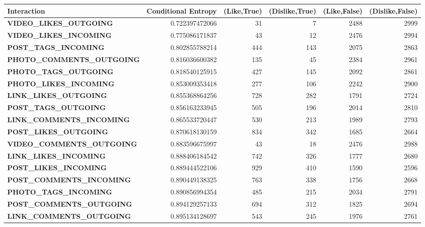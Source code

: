 \begin{table}
\begin{tabular}{| >{\small}l | >{\small}r | >{\small}r | >{\small}r | >{\small}r | >{\small}r |}
	\end{tabular}
\end{table}

\begin{table}
	\centering
	\begin{tabular}{| >{\small}l | >{\small}r | >{\small}r | >{\small}r | >{\small}r | >{\small}r |}
	\hline
	Interaction & Conditional Entropy & (Like,True) & (Dislike,True) & (Like,False) & (Dislike,False)\\
	\hline
	\textbf{VIDEO\_LIKES\_OUTGOING} & 0.722397472066 & 31 & 7 & 2488 & 2999\\
	\hline
	\textbf{VIDEO\_LIKES\_INCOMING} & 0.775086171837 & 43 & 12 & 2476 & 2994\\
	\hline
	\textbf{POST\_TAGS\_INCOMING} & 0.802855788214 & 444 & 143 & 2075 & 2863\\
	\hline
	\textbf{PHOTO\_COMMENTS\_OUTGOING} & 0.816036600382 & 135 & 45 & 2384 & 2961\\
	\hline
	\textbf{PHOTO\_TAGS\_OUTGOING} & 0.818540125915 & 427 & 145 & 2092 & 2861\\
	\hline
	\textbf{PHOTO\_LIKES\_INCOMING} & 0.853009353418 & 277 & 106 & 2242 & 2900\\
	\hline
	\textbf{LINK\_LIKES\_OUTGOING} & 0.855368864256 & 728 & 282 & 1791 & 2724\\
	\hline
	\textbf{POST\_TAGS\_OUTGOING} & 0.856163233945 & 505 & 196 & 2014 & 2810\\
	\hline
	\textbf{LINK\_COMMENTS\_INCOMING} & 0.865533720447 & 530 & 213 & 1989 & 2793\\
	\hline
	\textbf{POST\_LIKES\_OUTGOING} & 0.870618130159 & 834 & 342 & 1685 & 2664\\
	\hline
	\textbf{VIDEO\_COMMENTS\_OUTGOING} & 0.883596675997 & 43 & 18 & 2476 & 2988\\
	\hline
	\textbf{LINK\_LIKES\_INCOMING} & 0.888406184542 & 742 & 326 & 1777 & 2680\\
	\hline
	\textbf{POST\_LIKES\_INCOMING} & 0.889444522106 & 929 & 410 & 1590 & 2596\\
	\hline
	\textbf{POST\_COMMENTS\_INCOMING} & 0.890449138325 & 763 & 338 & 1756 & 2668\\
	\hline
	\textbf{PHOTO\_TAGS\_INCOMING} & 0.890856994354 & 485 & 215 & 2034 & 2791\\
	\hline
	\textbf{POST\_COMMENTS\_OUTGOING} & 0.894129257133 & 694 & 312 & 1825 & 2694\\
	\hline
	\textbf{LINK\_COMMENTS\_OUTGOING} & 0.895134128697 & 543 & 245 & 1976 & 2761\\

\end{tabular}
\end{table}
